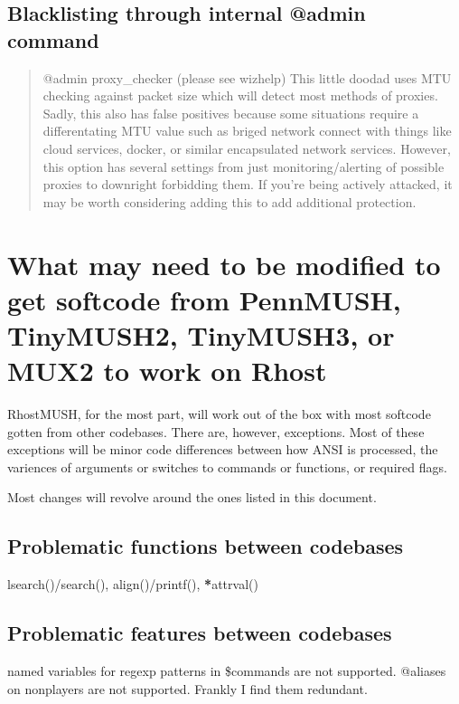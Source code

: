 \documentclass[letterpaper,10pt,english]{sphinxmanual}
\begin{document}
\section{Blacklisting through internal @admin command}
\label{\detokenize{09-blocking:blacklisting-through-internal-admin-command}}\begin{quote}

\sphinxAtStartPar
@admin proxy\_checker (please see wizhelp)
This little doodad uses MTU checking against packet size which will
detect most methods of proxies.  Sadly, this also has false positives
because some situations require a differentating MTU value such as
briged network connect with things like cloud services, docker, or
similar encapsulated network services.  However, this option has
several settings from just monitoring/alerting of possible proxies
to downright forbidding them.  If you’re being actively attacked,
it may be worth considering adding this to add additional protection.
\end{quote}


\chapter{What may need to be modified to get softcode from PennMUSH, TinyMUSH2, TinyMUSH3, or MUX2 to work on Rhost}
\label{\detokenize{10-customize:what-may-need-to-be-modified-to-get-softcode-from-pennmush-tinymush2-tinymush3-or-mux2-to-work-on-rhost}}\label{\detokenize{10-customize::doc}}
\sphinxAtStartPar
RhostMUSH, for the most part, will work out of the box with most softcode gotten
from other codebases.  There are, however, exceptions.  Most of these exceptions
will be minor code differences between how ANSI is processed, the variences
of arguments or switches to commands or functions, or required flags.

\sphinxAtStartPar
Most changes will revolve around the ones listed in this document.


\section{Problematic functions between codebases}
\label{\detokenize{10-customize:problematic-functions-between-codebases}}
\sphinxAtStartPar
lsearch()/search(), align()/printf(), {\color{red}\bfseries{}*}attrval()


\section{Problematic features between codebases}
\label{\detokenize{10-customize:problematic-features-between-codebases}}
\sphinxAtStartPar
named variables for regexp patterns in \$commands are not supported.
@aliases on non\sphinxhyphen{}players are not supported.  Frankly I find them redundant.
\end{document}
